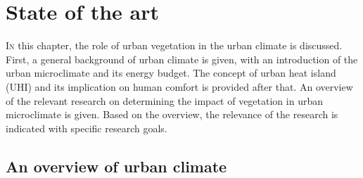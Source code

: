 \chapter{State of the art}
\label{ch:stateoftheart}
\def\figdir{chapters/ch02_stateoftheart/figures/}
	
%		



\lettrine[lines=3,nindent=0em,loversize=0.1]{I}{n} this chapter, the role of urban vegetation in the urban climate is discussed. First, a general background of urban climate is given, with an introduction of the urban microclimate and its energy budget. The concept of urban heat island (UHI) and its implication on human comfort is provided after that. An overview of the relevant research on determining the impact of vegetation in urban microclimate is given. Based on the overview, the relevance of the research is indicated with specific research goals.


\section{An overview of urban climate}


